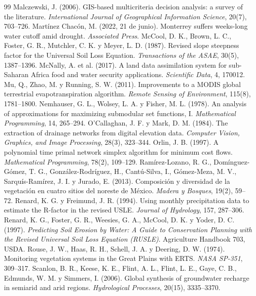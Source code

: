 \begin{thebibliography}{99}
 Malczewski, J. (2006). GIS-based multicriteria decision analysis: a survey of the literature. \emph{International Journal of Geographical Information Science}, 20(7), 703–726.
 Martínez Chacón, M. (2022, 21 de junio). Monterrey suffers weeks-long water cutoff amid drought. \emph{Associated Press}.
 McCool, D. K., Brown, L. C., Foster, G. R., Mutchler, C. K. y Meyer, L. D. (1987). Revised slope steepness factor for the Universal Soil Loss Equation. \emph{Transactions of the ASAE}, 30(5), 1387–1396.
 McNally, A. et al. (2017). A land data assimilation system for sub-Saharan Africa food and water security applications. \emph{Scientific Data}, 4, 170012.
 Mu, Q., Zhao, M. y Running, S. W. (2011). Improvements to a MODIS global terrestrial evapotranspiration algorithm. \emph{Remote Sensing of Environment}, 115(8), 1781–1800.
 Nemhauser, G. L., Wolsey, L. A. y Fisher, M. L. (1978). An analysis of approximations for maximizing submodular set functions, I. \emph{Mathematical Programming}, 14, 265–294.
 O'Callaghan, J. F. y Mark, D. M. (1984). The extraction of drainage networks from digital elevation data. \emph{Computer Vision, Graphics, and Image Processing}, 28(3), 323–344.
 Orlin, J. B. (1997). A polynomial time primal network simplex algorithm for minimum cost flows. \emph{Mathematical Programming}, 78(2), 109–129.
 Ramírez-Lozano, R. G., Domínguez-Gómez, T. G., González-Rodríguez, H., Cantú-Silva, I., Gómez-Meza, M. V., Sarquís-Ramírez, J. I. y Jurado, E. (2013). Composición y diversidad de la vegetación en cuatro sitios del noreste de México. \emph{Madera y Bosques}, 19(2), 59–72.
 Renard, K. G. y Freimund, J. R. (1994). Using monthly precipitation data to estimate the R-factor in the revised USLE. \emph{Journal of Hydrology}, 157, 287–306.
 Renard, K. G., Foster, G. R., Weesies, G. A., McCool, D. K. y Yoder, D. C. (1997). \emph{Predicting Soil Erosion by Water: A Guide to Conservation Planning with the Revised Universal Soil Loss Equation (RUSLE)}. Agriculture Handbook 703, USDA.
 Rouse, J. W., Haas, R. H., Schell, J. A. y Deering, D. W. (1974). Monitoring vegetation systems in the Great Plains with ERTS. \emph{NASA SP-351}, 309–317.
 Scanlon, B. R., Keese, K. E., Flint, A. L., Flint, L. E., Gaye, C. B., Edmunds, W. M. y Simmers, I. (2006). Global synthesis of groundwater recharge in semiarid and arid regions. \emph{Hydrological Processes}, 20(15), 3335–3370.

\end{thebibliography}
